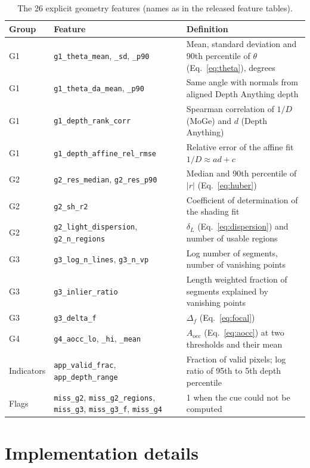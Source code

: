\documentclass[11pt,a4paper]{article}
\newcommand{\feat}[1]{\texttt{#1}}
\begin{document}
\begin{table}[h]
\centering
\caption{The 26 explicit geometry features (names as in the released feature tables).}
\label{tab:features}
\small
\begin{tabularx}{\linewidth}{@{}l l X@{}}
\toprule
Group & Feature & Definition \\
\midrule
G1 & \feat{g1\_theta\_mean}, \feat{\_sd}, \feat{\_p90} & Mean, standard deviation and 90th percentile of $\theta$ (Eq.~\ref{eq:theta}), degrees \\
G1 & \feat{g1\_theta\_da\_mean}, \feat{\_p90} & Same angle with normals from aligned Depth Anything depth \\
G1 & \feat{g1\_depth\_rank\_corr} & Spearman correlation of $1/D$ (MoGe) and $d$ (Depth Anything) \\
G1 & \feat{g1\_depth\_affine\_rel\_rmse} & Relative error of the affine fit $1/D \approx a d + c$ \\
G2 & \feat{g2\_res\_median}, \feat{g2\_res\_p90} & Median and 90th percentile of $|r|$ (Eq.~\ref{eq:huber}) \\
G2 & \feat{g2\_sh\_r2} & Coefficient of determination of the shading fit \\
G2 & \feat{g2\_light\_dispersion}, \feat{g2\_n\_regions} & $\delta_L$ (Eq.~\ref{eq:dispersion}) and number of usable regions \\
G3 & \feat{g3\_log\_n\_lines}, \feat{g3\_n\_vp} & Log number of segments, number of vanishing points \\
G3 & \feat{g3\_inlier\_ratio} & Length weighted fraction of segments explained by vanishing points \\
G3 & \feat{g3\_delta\_f} & $\Delta_f$ (Eq.~\ref{eq:focal}) \\
G4 & \feat{g4\_aocc\_lo}, \feat{\_hi}, \feat{\_mean} & $A_{\mathrm{occ}}$ (Eq.~\ref{eq:aocc}) at two thresholds and their mean \\
Indicators & \feat{app\_valid\_frac}, \feat{app\_depth\_range} & Fraction of valid pixels; log ratio of 95th to 5th depth percentile \\
Flags & \feat{miss\_g2}, \feat{miss\_g2\_regions}, \feat{miss\_g3}, \feat{miss\_g3\_f}, \feat{miss\_g4} & 1 when the cue could not be computed \\
\bottomrule
\end{tabularx}
\end{table}

\section{Implementation details}
\label{app:impl}
\end{document}
